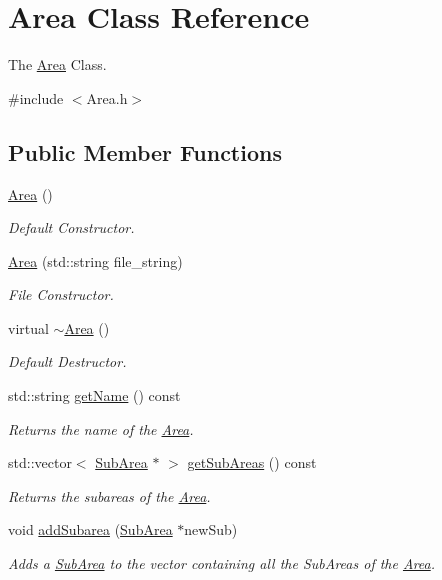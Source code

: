 \hypertarget{classArea}{}\section{Area Class Reference}
\label{classArea}


The \hyperlink{classArea}{Area} Class.  




{\ttfamily \#include $<$Area.\+h$>$}

\subsection*{Public Member Functions}
\begin{DoxyCompactItemize}
\item 
\hyperlink{classArea_aa92851fcffb0a9f1c6c8c283204f7003}{Area} ()
\begin{DoxyCompactList}\small\item\em Default Constructor. \end{DoxyCompactList}\item 
\hyperlink{classArea_afd32499f2246ef8007fd135d7503da16}{Area} (std\+::string file\+\_\+string)
\begin{DoxyCompactList}\small\item\em File Constructor. \end{DoxyCompactList}\item 
virtual \hyperlink{classArea_ace0975982b61a16746c564a0d43a4cc8}{$\sim$\+Area} ()
\begin{DoxyCompactList}\small\item\em Default Destructor. \end{DoxyCompactList}\item 
std\+::string \hyperlink{classArea_acdbc3527be262d1ea1b9c961e823257f}{get\+Name} () const
\begin{DoxyCompactList}\small\item\em Returns the name of the \hyperlink{classArea}{Area}. \end{DoxyCompactList}\item 
std\+::vector$<$ \hyperlink{classSubArea}{Sub\+Area} $\ast$ $>$ \hyperlink{classArea_abf3bfb978d0a7d05fe2cbbad9ce7fef4}{get\+Sub\+Areas} () const
\begin{DoxyCompactList}\small\item\em Returns the subareas of the \hyperlink{classArea}{Area}. \end{DoxyCompactList}\item 
void \hyperlink{classArea_a137ad0664d3993ff994e2381804459e2}{add\+Subarea} (\hyperlink{classSubArea}{Sub\+Area} $\ast$new\+Sub)
\begin{DoxyCompactList}\small\item\em Adds a \hyperlink{classSubArea}{Sub\+Area} to the vector containing all the Sub\+Areas of the \hyperlink{classArea}{Area}. \end{DoxyCompactList}\end{DoxyCompactItemize}
